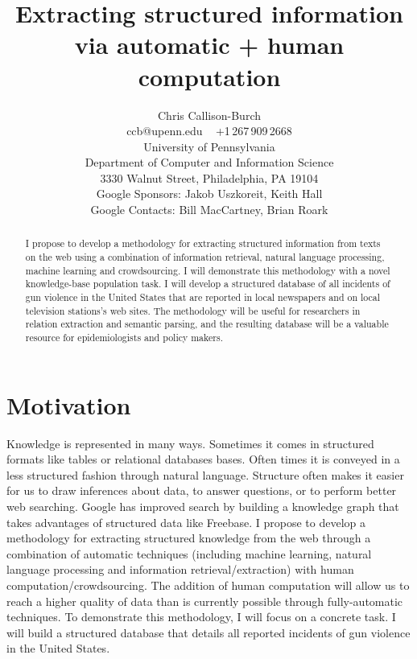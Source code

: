 \documentclass[11pt]{article}
\title{Extracting structured information via automatic + human computation}
\author{Chris Callison-Burch \\
 ccb@upenn.edu ~ +1\,267\,909\,2668 \\
 University of Pennsylvania \\
 Department of Computer and Information Science \\
 3330 Walnut Street, Philadelphia, PA 19104 \\
 Google Sponsors: Jakob Uszkoreit, Keith Hall  \\
 Google Contacts: Bill MacCartney, Brian Roark}
\date{}
\begin{document}
\maketitle

\begin{abstract}
I propose to develop a methodology for extracting structured information from texts on the web using a combination of information retrieval, natural language processing, machine learning and crowdsourcing.  I will demonstrate this methodology with a novel knowledge-base population task.  I will develop a structured database of all incidents of gun violence in the United States that are reported in local newspapers and on local television stations's web sites. The methodology will be useful for researchers in relation extraction and semantic parsing, and the resulting database will be a valuable resource for epidemiologists and policy makers. 
\end{abstract}

\section{Motivation}

Knowledge is represented in many ways.  Sometimes it comes in structured formats like tables or relational databases bases.  Often times it is conveyed in a less structured fashion through natural language.  Structure often makes it easier for us to draw inferences about data, to answer questions, or to perform better web searching.  Google has improved search by building a knowledge graph that takes advantages of structured data like Freebase.  I propose to develop a methodology for extracting structured knowledge from the web through a combination of automatic techniques (including machine learning, natural language processing and information retrieval/extraction) with human computation/crowdsourcing.  The addition of human computation will allow us to reach a higher quality of data than is currently possible through fully-automatic techniques. To demonstrate this methodology, I will focus on a concrete task.  I will build a structured database that details all reported incidents of gun violence in the United States.  
\end{document}
